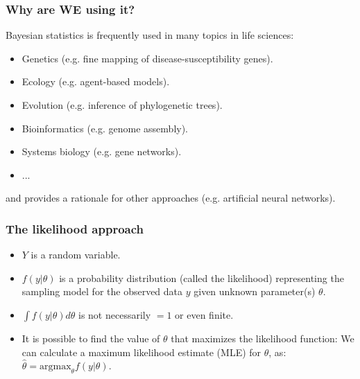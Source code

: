 \documentclass{beamer}
\newcommand{\1}{\ensuremath{\mathbf{1}}}
\begin{document}
%
%
%
\begin{frame}\frametitle{Why are WE using it?}
	\begin{block}{}
		Bayesian statistics is frequently used in many topics in life sciences:
		\begin{itemize}
			\item Genetics (e.g. fine mapping of disease-susceptibility genes).
			\item Ecology (e.g. agent-based models).
			\item Evolution (e.g. inference of phylogenetic trees).
			\item Bioinformatics (e.g. genome assembly).
			\item Systems biology (e.g. gene networks).
			\item ...
		\end{itemize}
		and provides a rationale for other approaches (e.g. artificial neural networks).
	\end{block}
\end{frame}
%
%
%
\begin{frame}\frametitle{The likelihood approach}
	\begin{block}{}
		\begin{itemize}
			\item $Y$ is a random variable.
			\item $f(y|\theta)$ is a probability distribution (called the likelihood) representing the sampling model for the observed data $y$ given unknown parameter(s) $\theta$.
			\item $\int f (y|\theta)d\theta$ is not necessarily $= 1$ or even finite.
			\item It is possible to find the value of $\theta$ that maximizes the likelihood function: We can calculate a maximum likelihood estimate (MLE) for $\theta$, as: $\hat\theta = \text{argmax}_\theta f (y|\theta)$.
		\end{itemize}
	\end{block}
\end{frame}
\end{document}

